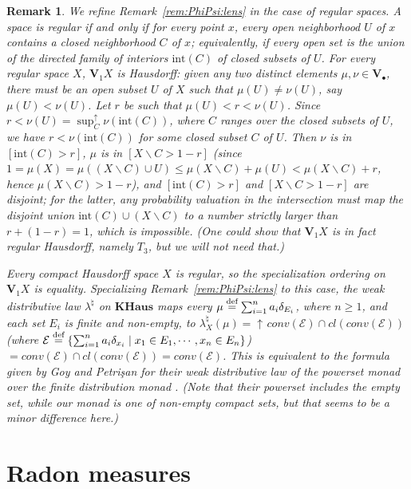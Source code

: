 \documentclass[preprint,12pt]{elsarticle}
\newcommand\eqdef{\mathrel{\buildrel \text{def}\over=}}
\newcommand\diff{\smallsetminus}
\DeclareMathOperator{\upc}{\uparrow\!}
\newcommand\Val{{\mathbf V}}
\newcommand{\interior}[1]{\text{int} ({#1})} %
\newcommand\dsup{\sup\nolimits^{\scriptstyle\uparrow}}
\newtheorem{remark}[theorem]{Remark}
\begin{document}
\begin{remark}
  \label{rem:PhiPsi:lens:T1}
  We refine Remark~\ref{rem:PhiPsi:lens} in the case of regular
  spaces.  A space is \emph{regular} if and only if for every point
  $x$, every open neighborhood $U$ of $x$ contains a closed
  neighborhood $C$ of $x$; equivalently, if every open set is the
  union of the directed family of interiors $\interior C$ of closed
  subsets of $U$.  For every regular space $X$, $\Val_1 X$ is
  Hausdorff: given any two distinct elements
  $\mu, \nu \in \Val_\bullet$, there must be an open subset $U$ of $X$
  such that $\mu (U) \neq \nu (U)$, say $\mu (U) < \nu (U)$.  Let $r$
  be such that $\mu (U) < r < \nu (U)$.  Since
  $r < \nu (U) = \dsup_C \nu (\interior C)$, where $C$ ranges over the
  closed subsets of $U$, we have $r < \nu (\interior C)$ for some
  closed subset $C$ of $U$.  Then $\nu$ is in $[\interior C > r]$,
  $\mu$ is in $[X \diff C > 1-r]$ (since
  $1 = \mu (X) = \mu ((X \diff C) \cup U) \leq \mu (X \diff C) + \mu
  (U) < \mu (X \diff C) + r$, hence $\mu (X \diff C) > 1-r$), and
  $[\interior C > r]$ and $[X \diff C > 1-r]$ are disjoint; for the
  latter, any probability valuation in the intersection must map the
  disjoint union $\interior C \cup (X \diff C)$ to a number strictly
  larger than $r + (1-r)=1$, which is impossible.  (One could show
  that $\Val_1 X$ is in fact regular Hausdorff, namely $T_3$, but we
  will not need that.)

  Every compact Hausdorff space $X$ is regular, so the specialization
  ordering on $\Val_1 X$ is equality.  Specializing
  Remark~\ref{rem:PhiPsi:lens} to this case, the weak distributive law
  $\lambda^\natural$ on $\mathbf{KHaus}$ maps every
  $\mu \eqdef \sum_{i=1}^n a_i \delta_{E_i}$, where $n \geq 1$, and
  each set $E_i$ is finite and non-empty, to
  $\lambda^\natural_X (\mu) = \upc conv (\mathcal E) \cap cl (conv
  (\mathcal E))$ (where
  $\mathcal E \eqdef \{\sum_{i=1}^n a_i \delta_{x_i} \mid x_1 \in E_1,
  \cdots, x_n \in E_n\}$)
  $= conv (\mathcal E) \cap cl (conv (\mathcal E)) = conv (\mathcal
  E)$.  This is equivalent to the formula given by Goy and Petri\c san
  for their weak distributive law of the powerset monad over the
  finite distribution monad \cite[Lemma~3.1]{goypetr-dp}.  (Note that
  their powerset includes the empty set, while our monad is one of
  non-empty compact sets, but that seems to be a minor difference
  here.)
\end{remark}

\section{Radon measures}
\label{sec:radon-measures}
\end{document}
